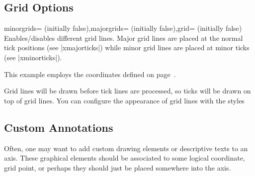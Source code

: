 


\subsection{Grid Options}
	
\begin{pgfplotsxykeylist}{\x minorgrids= (initially false),\x majorgrids= (initially false),grid= (initially false)}
Enables/disables different grid lines. Major grid lines are placed at the normal tick positions (see |xmajorticks|) while minor grid lines are placed at minor ticks (see |xminorticks|). 

This example employs the coordinates defined on page~\pageref{page:plotcoords:src}.
\begin{codeexample}[]
\begin{tikzpicture}
\begin{loglogaxis}[
	xlabel={\textsc{Dof}},
	ylabel={$L_2$ Error},
	grid=major
]
\plotcoords
\end{loglogaxis}
\end{tikzpicture}
\end{codeexample}

\begin{codeexample}[]
\end{codeexample}

Grid lines will be drawn before tick lines are processed, so ticks will be drawn on top of grid lines. You can configure the appearance of grid lines with the styles
\begin{codeexample}
\end{codeexample}
\end{pgfplotsxykeylist}


\subsection{Custom Annotations}
Often, one may want to add custom drawing elements or descriptive texts to an axis. These graphical elements should be associated to some logical coordinate, grid point, or perhaps they should just be placed somewhere into the axis.

